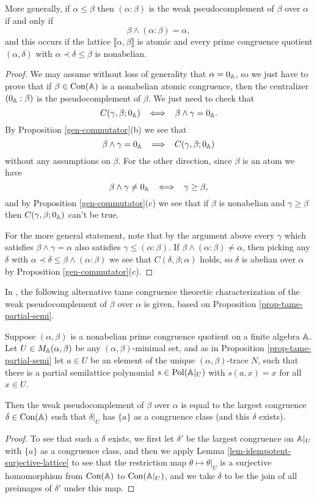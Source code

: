 \begin{appendices}
\begin{prop}
More generally, if $\alpha \le \beta$ then $(\alpha : \beta)$ is the weak pseudocomplement of $\beta$ over $\alpha$ if and only if
\[
\beta \wedge (\alpha : \beta) = \alpha,
\]
and this occurs if the lattice $\llbracket \alpha, \beta \rrbracket$ is atomic and every prime congruence quotient $(\alpha,\delta)$ with $\alpha \prec \delta \le \beta$ is nonabelian.
\end{prop}
\begin{proof} We may assume without loss of generality that $\alpha = 0_{\mathbb{A}}$, so we just have to prove that if $\beta \in \operatorname{Con}(\mathbb{A})$ is a nonabelian atomic congruence, then the centralizer $(0_{\mathbb{A}} : \beta)$ is the pseudocomplement of $\beta$. We just need to check that
\[
C(\gamma, \beta; 0_{\mathbb{A}}) \;\; \iff \;\; \beta \wedge \gamma = 0_{\mathbb{A}}.
\]
By Proposition \ref{gen-commutator}(b) we see that
\[
\beta \wedge \gamma = 0_{\mathbb{A}} \;\; \implies \;\; C(\gamma, \beta; 0_{\mathbb{A}})
\]
without any assumptions on $\beta$. For the other direction, since $\beta$ is an atom we have
\[
\beta \wedge \gamma \ne 0_{\mathbb{A}} \;\; \iff \;\; \gamma \ge \beta,
\]
and by Proposition \ref{gen-commutator}(c) we see that if $\beta$ is nonabelian and $\gamma \ge \beta$ then $C(\gamma, \beta; 0_{\mathbb{A}})$ can't be true.

For the more general statement, note that by the argument above every $\gamma$ which satisfies $\beta \wedge \gamma = \alpha$ also satisfies $\gamma \le (\alpha : \beta)$. If $\beta \wedge (\alpha : \beta) \ne \alpha$, then picking any $\delta$ with $\alpha \prec \delta \le \beta \wedge (\alpha : \beta)$ we see that $C(\delta, \beta; \alpha)$ holds, so $\delta$ is abelian over $\alpha$ by Proposition \ref{gen-commutator}(c).
\end{proof}

In \cite{hobby-mckenzie}, the following alternative tame congruence theoretic characterization of the weak pseudocomplement of $\beta$ over $\alpha$ is given, based on Proposition \ref{prop-tame-partial-semi}.

\begin{prop} Suppose $(\alpha,\beta)$ is a nonabelian prime congruence quotient on a finite algebra $\mathbb{A}$. Let $U \in M_{\mathbb{A}}(\alpha,\beta)$ be any $(\alpha,\beta)$-minimal set, and as in Proposition \ref{prop-tame-partial-semi} let $a \in U$ be an element of the unique $(\alpha,\beta)$-trace $N$, such that there is a partial semilattice polynomial $s \in \operatorname{Pol}(\mathbb{A}|_U)$ with $s(a,x) = x$ for all $x \in U$.

Then the weak pseudocomplement of $\beta$ over $\alpha$ is equal to the largest congruence $\delta \in \operatorname{Con}(\mathbb{A})$ such that $\delta|_U$ has $\{a\}$ as a congruence class (and this $\delta$ exists).
\end{prop}
\begin{proof} To see that such a $\delta$ exists, we first let $\delta'$ be the largest congruence on $\mathbb{A}|_U$ with $\{a\}$ as a congruence class, and then we apply Lemma \ref{lem-idempotent-surjective-lattice} to see that the restriction map $\theta \mapsto \theta|_U$ is a surjective homomorphism from $\operatorname{Con}(\mathbb{A})$ to $\operatorname{Con}(\mathbb{A}|_U)$, and we take $\delta$ to be the join of all preimages of $\delta'$ under this map.


\end{proof}
\end{appendices}
